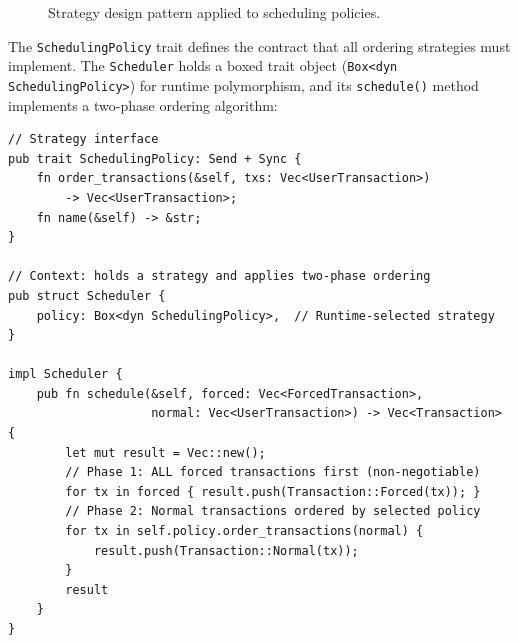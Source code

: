 \begin{figure}[htbp]
\centering
{}
\caption{Strategy design pattern applied to scheduling policies.}
\label{fig:strategy-pattern}
\end{figure}

The \texttt{SchedulingPolicy} trait defines the contract that all ordering strategies must implement. The \texttt{Scheduler} holds a boxed trait object (\texttt{Box<dyn SchedulingPolicy>}) for runtime polymorphism, and its \texttt{schedule()} method implements a two-phase ordering algorithm:

\begin{lstlisting}[style=rustStyle, caption={Strategy trait and scheduler context}, label={lst:scheduler}]
// Strategy interface
pub trait SchedulingPolicy: Send + Sync {
    fn order_transactions(&self, txs: Vec<UserTransaction>)
        -> Vec<UserTransaction>;
    fn name(&self) -> &str;
}

// Context: holds a strategy and applies two-phase ordering
pub struct Scheduler {
    policy: Box<dyn SchedulingPolicy>,  // Runtime-selected strategy
}

impl Scheduler {
    pub fn schedule(&self, forced: Vec<ForcedTransaction>,
                    normal: Vec<UserTransaction>) -> Vec<Transaction> {
        let mut result = Vec::new();
        // Phase 1: ALL forced transactions first (non-negotiable)
        for tx in forced { result.push(Transaction::Forced(tx)); }
        // Phase 2: Normal transactions ordered by selected policy
        for tx in self.policy.order_transactions(normal) {
            result.push(Transaction::Normal(tx));
        }
        result
    }
}
\end{lstlisting}

